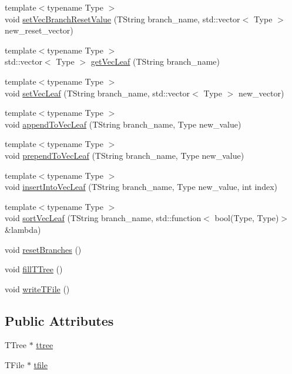 \begin{DoxyCompactItemize}
\item 
{\footnotesize template$<$typename Type $>$ }\\void \hyperlink{classArbol_a448653919588717f4dfbe910565a3563}{set\+Vec\+Branch\+Reset\+Value} (T\+String branch\+\_\+name, std\+::vector$<$ Type $>$ new\+\_\+reset\+\_\+vector)
\item 
{\footnotesize template$<$typename Type $>$ }\\std\+::vector$<$ Type $>$ \hyperlink{classArbol_a634be85d92f5f26403407952b10a29fd}{get\+Vec\+Leaf} (T\+String branch\+\_\+name)
\item 
{\footnotesize template$<$typename Type $>$ }\\void \hyperlink{classArbol_aa8547878e687941e4e84fc0e56f814d8}{set\+Vec\+Leaf} (T\+String branch\+\_\+name, std\+::vector$<$ Type $>$ new\+\_\+vector)
\item 
{\footnotesize template$<$typename Type $>$ }\\void \hyperlink{classArbol_a811156c9134ca7e0015bbe2ab95434b0}{append\+To\+Vec\+Leaf} (T\+String branch\+\_\+name, Type new\+\_\+value)
\item 
{\footnotesize template$<$typename Type $>$ }\\void \hyperlink{classArbol_a4ac9a92f2ac2e82500e342262bee0418}{prepend\+To\+Vec\+Leaf} (T\+String branch\+\_\+name, Type new\+\_\+value)
\item 
{\footnotesize template$<$typename Type $>$ }\\void \hyperlink{classArbol_a7ac9c4d6404c79519d277975a8566e60}{insert\+Into\+Vec\+Leaf} (T\+String branch\+\_\+name, Type new\+\_\+value, int index)
\item 
{\footnotesize template$<$typename Type $>$ }\\void \hyperlink{classArbol_aa4066700ccb5ecc42477538734ae6abb}{sort\+Vec\+Leaf} (T\+String branch\+\_\+name, std\+::function$<$ bool(Type, Type)$>$ \&lambda)
\item 
void \hyperlink{classArbol_a4c2184d378ab21a9627a57098291a7c4}{reset\+Branches} ()
\item 
void \hyperlink{classArbol_a1d029dd97a0451281c774b578d93bcda}{fill\+T\+Tree} ()
\item 
void \hyperlink{classArbol_ade7d835bbe383a70006e86785ae5672c}{write\+T\+File} ()
\end{DoxyCompactItemize}
\subsection*{Public Attributes}
\begin{DoxyCompactItemize}
\item 
T\+Tree $\ast$ \hyperlink{classArbol_abe1c658a04d96bb5bbf6eda7e90acf38}{ttree}
\item 
T\+File $\ast$ \hyperlink{classArbol_ae2b0964ee5e90cb2d7beb10810c14b9c}{tfile}
\end{DoxyCompactItemize}
